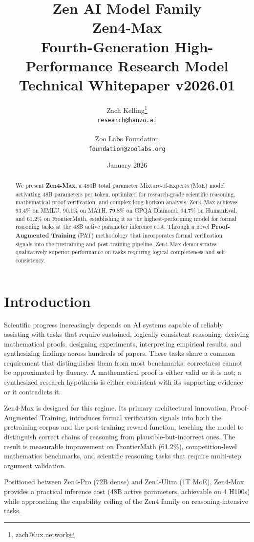\documentclass[11pt,a4paper]{article}
\title{
    \vspace{-2cm}
    \Large \textbf{Zen AI Model Family} \\
    \vspace{0.5cm}
    \Huge \textbf{Zen4-Max} \\
    \vspace{0.3cm}
    \large Fourth-Generation High-Performance Research Model \\
    \vspace{0.5cm}
    \normalsize Technical Whitepaper v2026.01
}
\author{
    Zach Kelling\thanks{zach@lux.network} \\
    \texttt{research@hanzo.ai} \\
    \\
    Zoo Labs Foundation \\
    \texttt{foundation@zoolabs.org}
}
\date{January 2026}
\begin{document}
\maketitle

\begin{abstract}
We present \textbf{Zen4-Max}, a 480B total parameter Mixture-of-Experts (MoE) model
activating 48B parameters per token, optimized for research-grade scientific reasoning,
mathematical proof verification, and complex long-horizon analysis. Zen4-Max achieves
93.4\% on MMLU, 90.1\% on MATH, 79.8\% on GPQA Diamond, 94.7\% on HumanEval, and
61.2\% on FrontierMath, establishing it as the highest-performing model for formal
reasoning tasks at the 48B active parameter inference cost. Through a novel
\textbf{Proof-Augmented Training} (PAT) methodology that incorporates formal verification
signals into the pretraining and post-training pipeline, Zen4-Max demonstrates qualitatively
superior performance on tasks requiring logical completeness and self-consistency.
\end{abstract}

\tableofcontents
\newpage

\section{Introduction}

Scientific progress increasingly depends on AI systems capable of reliably assisting
with tasks that require sustained, logically consistent reasoning: deriving mathematical
proofs, designing experiments, interpreting empirical results, and synthesizing findings
across hundreds of papers. These tasks share a common requirement that distinguishes them
from most benchmarks: correctness cannot be approximated by fluency. A mathematical proof
is either valid or it is not; a synthesized research hypothesis is either consistent with
its supporting evidence or it contradicts it.

Zen4-Max is designed for this regime. Its primary architectural innovation, Proof-Augmented
Training, introduces formal verification signals into both the pretraining corpus and the
post-training reward function, teaching the model to distinguish correct chains of reasoning
from plausible-but-incorrect ones. The result is measurable improvement on FrontierMath
(61.2\%), competition-level mathematics benchmarks, and scientific reasoning tasks that
require multi-step argument validation.

Positioned between Zen4-Pro (72B dense) and Zen4-Ultra (1T MoE), Zen4-Max provides a
practical inference cost (48B active parameters, achievable on 4 H100s) while approaching
the capability ceiling of the Zen4 family on reasoning-intensive tasks.
\end{document}
